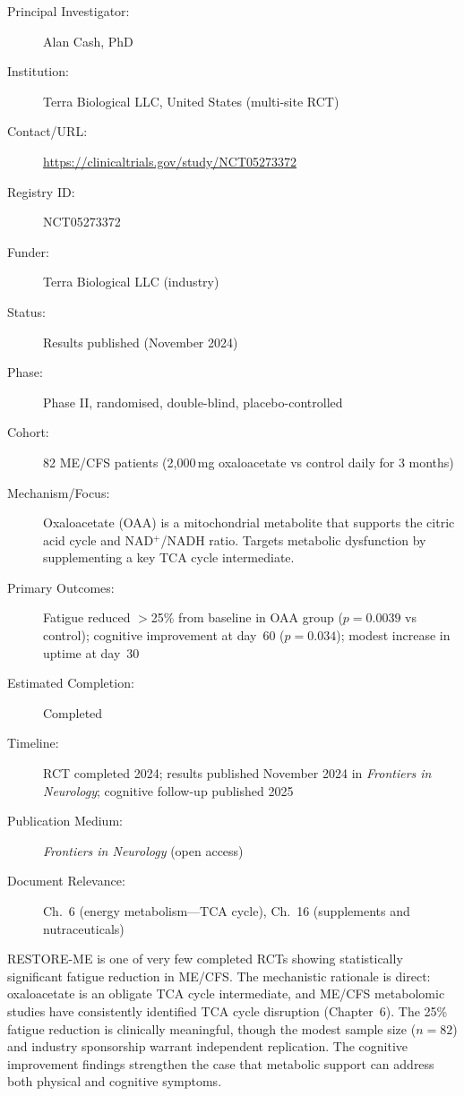 \begin{description}
    \item[Principal Investigator:] Alan Cash, PhD
    \item[Institution:] Terra Biological LLC, United States (multi-site RCT)
    \item[Contact/URL:] \url{https://clinicaltrials.gov/study/NCT05273372}
    \item[Registry ID:] NCT05273372
    \item[Funder:] Terra Biological LLC (industry)
    \item[Status:] Results published (November 2024)
    \item[Phase:] Phase II, randomised, double-blind, placebo-controlled
    \item[Cohort:] 82 ME/CFS patients (2,000\,mg oxaloacetate vs control
        daily for 3 months)
    \item[Mechanism/Focus:] Oxaloacetate (OAA) is a mitochondrial metabolite
        that supports the citric acid cycle and NAD$^+$/NADH ratio.
        Targets metabolic dysfunction by supplementing a key TCA cycle
        intermediate.
    \item[Primary Outcomes:] Fatigue reduced $>$25\% from baseline in
        OAA group ($p=0.0039$ vs control); cognitive improvement at
        day~60 ($p=0.034$); modest increase in uptime at day~30
    \item[Estimated Completion:] Completed
    \item[Timeline:] RCT completed 2024; results published November 2024
        in \textit{Frontiers in Neurology}; cognitive follow-up published
        2025
    \item[Publication Medium:] \textit{Frontiers in Neurology} (open access)
    \item[Document Relevance:] Ch.~6 (energy metabolism---TCA cycle),
        Ch.~16 (supplements and nutraceuticals)
\end{description}

RESTORE-ME is one of very few completed RCTs showing statistically significant
fatigue reduction in ME/CFS.  The mechanistic rationale is direct: oxaloacetate
is an obligate TCA cycle intermediate, and ME/CFS metabolomic studies have
consistently identified TCA cycle disruption (Chapter~6).  The 25\% fatigue
reduction is clinically meaningful, though the modest sample size ($n=82$)
and industry sponsorship warrant independent replication.  The cognitive
improvement findings strengthen the case that metabolic support can address
both physical and cognitive symptoms.


